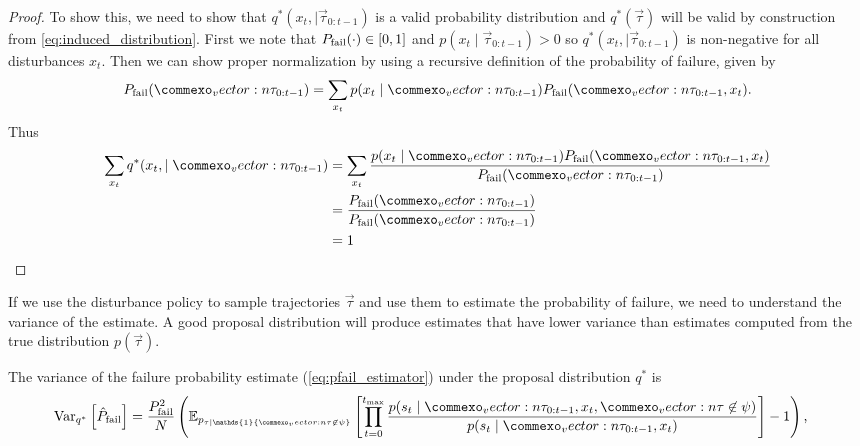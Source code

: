 \begin{proof}
To show this, we need to show that $q^*(x_t, \mid \vec{\tau}_{0:t-1})$ is a valid probability distribution and $q^*(\vec{\tau})$ will be valid by construction from \cref{eq:induced_distribution}. First we note that $P_{\rm fail}(\cdot) \in [0,1]$ and $p(x_t \mid \vec{\tau}_{0:t-1}) > 0$ so $q^*(x_t, \mid \vec{\tau}_{0:t-1})$ is non-negative for all disturbances $x_t$. Then we can show proper normalization by using a recursive definition of the probability of failure, given by 
\begin{equation}
    P_{\rm fail}(\vec{\tau}_{0:t-1}) = \sum_{x_t} p(x_t \mid \vec{\tau}_{0:t-1}) P_{\rm fail}(\vec{\tau}_{0:t-1}, x_t) \text{.}
\end{equation}
Thus
\begin{align}
    \sum_{x_t} q^*(x_t, \mid \vec{\tau}_{0:t-1}) &= \sum_{x_t} \frac{p(x_t \mid \vec{\tau}_{0:t-1}) P_{\rm fail}(\vec{\tau}_{0:t-1}, x_t)}{P_{\rm fail}(\vec{\tau}_{0:t-1})} \\
    &= \frac{P_{\rm fail}(\vec{\tau}_{0:t-1})}{P_{\rm fail}(\vec{\tau}_{0:t-1})} \\
    &= 1
\end{align}
\end{proof}

If we use the disturbance policy to sample trajectories $\vec{\tau}$ and use them to estimate the probability of failure, we need to understand the variance of the estimate. A good proposal distribution will produce estimates that have lower variance than estimates computed from the true distribution $p(\vec{\tau})$.

\begin{proposition}
The variance of the failure probability estimate (\cref{eq:pfail_estimator}) under the proposal distribution $q^*$ is
\begin{align}
    \text{Var}_{q^*}\left[ \hat{P}_{\rm fail} \right] &= \frac{P_{\rm fail}^2}{N} \left( \mathbb{E}_{p_{\tau \mid \mathds{1} \{\vec{\tau} \not \in \psi\}}}  \left[ \prod_{t=0}^{t_{\rm max}} \frac{p(s_t \mid \vec{\tau}_{0:t-1}, x_t, \vec{\tau} \not \in \psi)}{p(s_t \mid \vec{\tau}_{0:t-1}, x_t)} \right] - 1 \right) \text{,}
\end{align}
\end{proposition}

